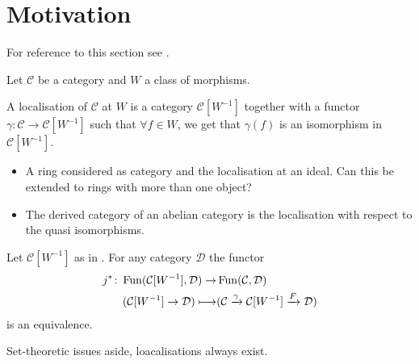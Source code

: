 \section{Motivation}

For reference to this section see \cite[Preface]{Cisinski_2019}.

Let $\mathcal{C}$ be a category and $W$ a class of morphisms.

\begin{defi}
\label{localisation_morphisms}
    A localisation of $\mathcal{C}$ at $W$ is a category $\mathcal{C}[W^{-1}]$ together with a functor $\gamma\colon \mathcal{C} \to \mathcal{C}[W^{-1}]$ such that $\forall f \in W$, we get that $\gamma(f)$ is an isomorphism in $\mathcal{C}[W^{-1}]$.
\end{defi}

\begin{exmp}
    \begin{itemize}
        \item 
        A ring considered as category and the localisation at an ideal.
        Can this be extended to rings with more than one object?
        \item 
        The derived category of an abelian category is the localisation with respect to the quasi isomorphisms.
    \end{itemize}
\end{exmp}

\begin{prop}
    Let $\mathcal{C}[W^{-1}]$ as in . 
    For any category $\mathcal{D}$ the functor 
        \begin{align*}
            j^*\colon\operatorname{Fun}(\mathcal{C}[W^{-1}], \mathcal{D}) 
            \to
            &
            \operatorname{Fun}(\mathcal{C},\mathcal{D})
            \\
            (\mathcal{C}[W^{-1}] \to 
            \mathcal{D})\longmapsto
            &
            (\mathcal{C} \xrightarrow{\gamma}
            \mathcal{C}[W^{-1}]
            \xrightarrow{F}
            \mathcal{D})
        \end{align*}
    is an equivalence.
\end{prop}

\begin{thm}%
    Set-theoretic issues aside, loacalisations always exist. 
\end{thm}
    

